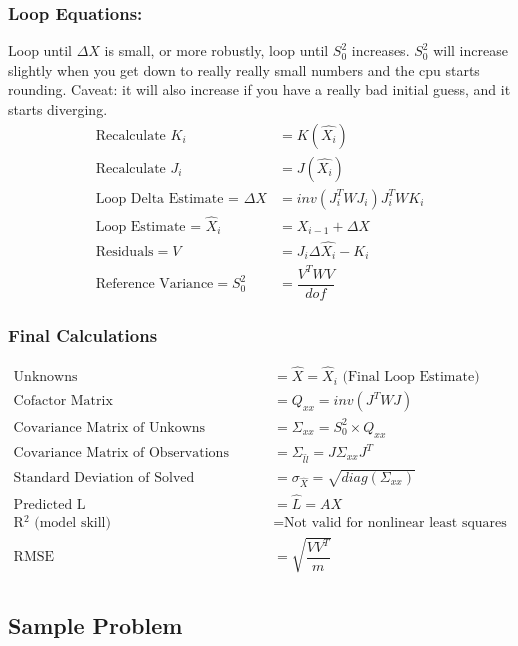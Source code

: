 \subsubsection{Loop Equations:}
Loop until $\Delta X $ is small, or more robustly, loop until $S_0^2$ increases.  $S_0^2$ will increase slightly when you get down to really really small numbers and the cpu starts rounding.  Caveat: it will also increase if you have a really bad initial guess, and it starts diverging.
\vspace{0.15cm}
\begin{align*}
\text{Recalculate } K_i & = K(\hat{X_i})\\
\text{Recalculate } J_i & = J(\hat{X_i})\\
\text{Loop Delta Estimate = }\Delta X &= inv(J_i^TWJ_i)J_i^TWK_i \\
\text{Loop Estimate = } \hat{X}_i &= X_{i-1}+\Delta X \\
\text{Residuals} = V &= J_i\Delta \hat{X_i} - K_i \\
\text{Reference Variance} = S_0^2 &= \dfrac{V^TWV}{dof}
\end{align*}
	
\subsubsection{Final Calculations}
\begin{align*}
	\text{Unknowns} &= \hat{X} = \hat{X}_i \text{   (Final Loop Estimate)}\\
	\text{Cofactor Matrix} &= Q_{xx} = inv(J^TWJ) \\
	\text{Covariance Matrix of Unkowns} &= \Sigma_{xx} = S_0^2 \times Q_{xx} \\
	\text{Covariance Matrix of Observations} &= \Sigma_{\hat{l}\hat{l}} = J \Sigma_{xx} J^T \\
	\text{Standard Deviation of Solved Unknowns} &= \sigma_{\hat{X}} = \sqrt{diag(\Sigma_{xx})} \\
	\text{Predicted L} &= \hat{L} = AX \\
	\text{R$^2$ (model skill)} &= \text{Not valid for nonlinear least squares} \\
	\text{RMSE } &= \sqrt{\dfrac{VV^T}{m}} \\
\end{align*}
\clearpage
\subsection{Sample Problem}

